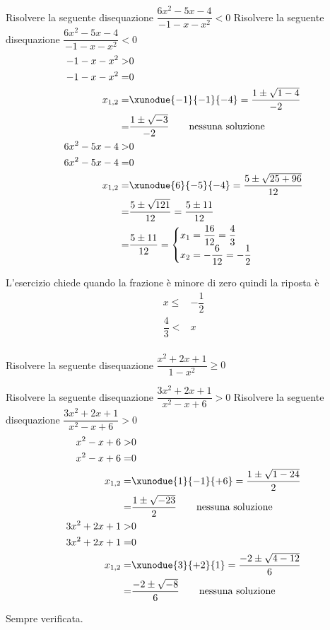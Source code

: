\begin{exercise}
		Risolvere la seguente disequazione $\dfrac{6x^2-5x-4}{-1-x-x^2}< 0$
	\tcblower
	Risolvere la seguente disequazione $\dfrac{6x^2-5x-4}{-1-x-x^2}< 0$
\begin{align*}
-1-x-x^2>&0\\
-1-x-x^2=&0\\
x_{1,2}=&\xunodue{-1}{-1}{-4}=\dfrac{1\pm\sqrt{1-4}}{-2}\\
=&\dfrac{1\pm\sqrt{-3}}{-2}
\qquad\text{nessuna soluzione}\\
6x^2-5x-4>&0\\
6x^2-5x-4=&0\\
x_{1,2}=&\xunodue{6}{-5}{-4}=\dfrac{5\pm\sqrt{25+96}}{12}\\
=&\dfrac{5\pm\sqrt{121}}{12}=\dfrac{5\pm 11}{12}\\
=&\dfrac{5\pm 11}{12}=\begin{cases}
x_1=\dfrac{16}{12}=\dfrac{4}{3}\\
x_2=-\dfrac{6}{12}=-\dfrac{1}{2}
\end{cases}\\
\end{align*}
\begin{center}
	
\end{center}
L'esercizio chiede quando la frazione è minore di zero quindi la riposta è 
\begin{align*}
x\leq& -\dfrac{1}{2}\\  \dfrac{4}{3}<&x\\
\end{align*}
\end{exercise}
\begin{exercise}[no solution]
		Risolvere la seguente disequazione $\dfrac{x^2+2x+1}{1-x^2}\geq 0$
\end{exercise}
\begin{exercise}
		Risolvere la seguente disequazione $\dfrac{3x^2+2x+1}{x^2-x+6}> 0$
\tcblower
Risolvere la seguente disequazione $\dfrac{3x^2+2x+1}{x^2-x+6}> 0$
\begin{align*}
x^2-x+6>&0\\
x^2-x+6=&0\\
x_{1,2}=&\xunodue{1}{-1}{+6}=\dfrac{1\pm\sqrt{1-24}}{2}\\
=&\dfrac{1\pm\sqrt{-23}}{2}
\qquad\text{nessuna soluzione}\\
3x^2+2x+1>&0\\
3x^2+2x+1=&0\\
x_{1,2}=&\xunodue{3}{+2}{1}=\dfrac{-2\pm\sqrt{4-12}}{6}\\
=&\dfrac{-2\pm\sqrt{-8}}{6}
\qquad\text{nessuna soluzione}\\
\end{align*}
\begin{center}
	
\end{center}
Sempre verificata.
\end{exercise}

